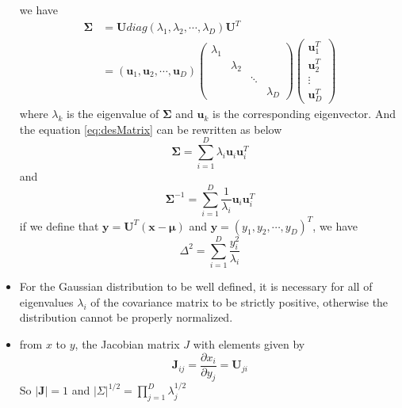 \documentclass[12pt, a4paper]{article}
\begin{document}
\begin{itemize}
        we have
        \begin{align}
            \label{eq:desMatrix}
            \bm{\Sigma}&=\bm{U}diag(\lambda_1,\lambda_2,\cdots,\lambda_D)\bm{U}^T\nonumber\\
            &=(\bm{u}_1,\bm{u}_2,\cdots,\bm{u}_D)\begin{pmatrix}
                \lambda_1 & && \\
                &\lambda_2&&\\
                 & & \ddots&\\
                && & \lambda_D
            \end{pmatrix}\begin{pmatrix}
                \bm{u}_1^T\\
                \bm{u}_2^T\\
                \vdots\\
                \bm{u}_D^T
            \end{pmatrix}
        \end{align}
        where $\lambda_k$ is the eigenvalue of $\bm{\Sigma}$ and $\bm{u}_k$ is the 
        corresponding eigenvector. And the equation \ref{eq:desMatrix} can be rewritten
        as below
        \begin{equation}
            \bm{\Sigma}=\sum_{i=1}^D\lambda_i\bm{u}_i\bm{u}_i^T
        \end{equation}
        and
        \begin{equation}
            \bm{\Sigma}^{-1}=\sum_{i=1}^D\frac{1}{\lambda_i}\bm{u}_i\bm{u}_i^T
        \end{equation}
        if we define that $\bm{y}=\bm{U}^T(\bm{x}-\bm{\mu})$ and $\bm{y}=(y_1,y_2,\cdots,y_D)^T$,
        we have
        \begin{equation}
            \Delta^2=\sum_{i=1}^{D}\frac{y_i^2}{\lambda_i}
        \end{equation}
        \item For the Gaussian distribution to be well defined, it is necessary for all of 
        eigenvalues $\lambda_i$ of the covariance matrix to be strictly positive, otherwise the 
        distribution cannot be properly normalized.
        \item from $x$ to $y$, the Jacobian matrix $J$ with elements given by
        \begin{equation*}
            \bm{J}_{ij}=\frac{\partial{x_i}}{\partial{y_j}}=\bm{U}_{ji}
        \end{equation*}
        So $|\bm{J}|=1$ and $|\Sigma|^{1/2}=\prod_{j=1}^D\lambda_j^{1/2}$

\end{itemize}
\end{document}
